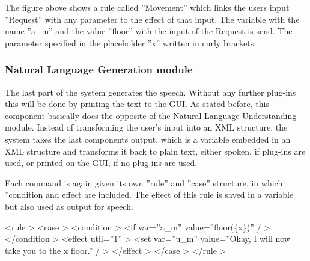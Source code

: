 \documentclass[a4paper, 12pt]{article}
\begin{document}
        The figure above shows  a rule called ”Movement” which links the users input ”Request” with any parameter to the effect of that input.
        The variable with the name ”a\_m” and the value ”floor” with the input of the Request is send.
        The parameter specified in the placeholder ”x” written in curly brackets.

        \subsubsection{Natural Language Generation module}

        The last part of the system generates the speech. 
        Without any further plug-ins this will be done by printing the text to the GUI.
        As stated before, this component basically does the opposite of the Natural Language Understanding module. 
        Instead of transforming the user's input into an XML structure, the system takes the last components output, which is a variable embedded in an XML structure and transforms it back to plain text, either spoken, if plug-ins are used, or printed on the GUI, if no plug-ins are used. \newline

        Each command is again given its own ”rule” and ”case” structure, in which ”condition and effect are included. 
        The effect of this rule is saved in a variable but also used as output for speech. \newline

        \textless rule \textgreater \newline
        \indent \indent \textless case \textgreater \newline
        \indent \indent \indent \textless condition \textgreater \newline 
        \indent \indent \indent \indent \textless if var=”a\_m” value=”floor(\{x\})” / \textgreater \newline
        \indent \indent \indent \textless /condition \textgreater \newline
        \indent \indent \indent \textless effect util=”1” \textgreater \newline 
        \indent \indent \indent \indent \textless set var=”u\_m” value=”Okay, I will now take you to the {x} floor.” / \textgreater \newline
        \indent \indent \indent \textless /effect \textgreater \newline
        \indent \indent\textless /case \textgreater \newline
        \indent \textless /rule \textgreater \newline
\end{document}

